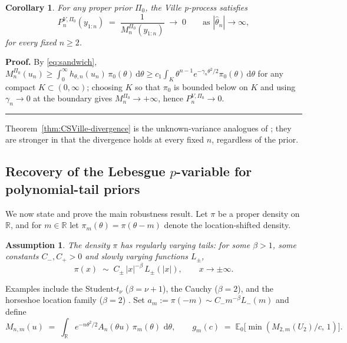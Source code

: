 \documentclass{article}%
\newtheorem{assumption}[theorem]{Assumption}
\newtheorem{corollary}[theorem]{Corollary}
\newenvironment{proof}[1][Proof]{\noindent\textbf{#1.} }{\ \rule{0.5em}{0.5em}}
\newcommand{\R}{\mathbb{R}}
\newcommand{\E}{\mathbb{E}}
\newcommand{\dd}{\,\mathrm{d}}
\begin{document}
\begin{corollary}\label{cor:Ville-pdegen}
For any proper prior \(\Pi_0\), the Ville p-process satisfies
\[
  P_n^{V,\Pi_0}(y_{1:n})\;=\;\frac{1}{M_n^{\Pi_0}(y_{1:n})}
  \;\longrightarrow\;0\qquad\text{as }|\widehat\theta_n|\to\infty,
\]
for every fixed \(n\geq 2\).
\end{corollary}


\begin{proof}
By \eqref{eq:sandwich}, \(M_n^{\Pi_0}(u_n)\geq
\int_0^\infty h_{\theta,n}(u_n)\,\pi_0(\theta)\dd\theta
\geq c_1\int_K \theta^{n-1}e^{-\gamma_n\theta^2/2}\pi_0(\theta)\dd\theta\)
for any compact \(K\subset(0,\infty)\); choosing \(K\) so that
\(\pi_0\) is bounded below on \(K\) and using \(\gamma_n\to 0\) at the
boundary gives \(M_n^{\Pi_0}\to+\infty\), hence
\(P_n^{V,\Pi_0}\to 0\).
\end{proof}

Theorem~\ref{thm:CSVille-divergence} is the unknown-variance analogues of
\cite[Theorem 4.1]{Cortinovis2025}; they are stronger in that the
divergence holds at every fixed \(n\), regardless of the prior.

\subsection{Recovery of the Lebesgue $p$-variable for polynomial-tail priors}
\label{sec:recovery}

We now state and prove the main robustness result. Let \(\pi\) be a
proper density on \(\R\), and for \(m\in\R\) let
\(\pi_m(\theta)=\pi(\theta-m)\) denote the location-shifted density.

\begin{assumption}\label{ass:tails}
The density \(\pi\) has regularly varying tails: for some
\(\beta>1\), some constants \(C_-,C_+>0\) and slowly varying
functions \(L_\pm\),
\begin{equation}\label{eq:tails}
   \pi(x)\;\sim\; C_\pm\,|x|^{-\beta}\,L_\pm(|x|),\qquad x\to\pm\infty.
\end{equation}
\end{assumption}

Examples include the Student-\(t_\nu\) (\(\beta=\nu+1\)), the Cauchy
(\(\beta=2\)), and the horseshoe location family (\(\beta=2\))
\cite{Carvalho2010}. Set
\(a_m:=\pi(-m)\sim C_-m^{-\beta}L_-(m)\) and define
\begin{equation}\label{eq:Mnm-def}
  M_{n,m}(u)\;=\;\int_\R e^{-n\theta^2/2}A_n(\theta u)\,\pi_m(\theta)
  \,\dd\theta,
  \qquad
  g_m(c)\;=\;\E_0\!\bigl[\min(M_{2,m}(U_2)/c,\,1)\bigr].
\end{equation}
\end{document}
